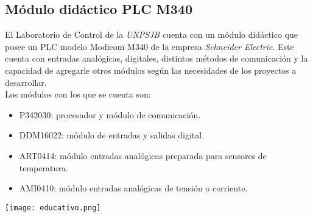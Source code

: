 \subsection{Módulo didáctico PLC M340} \label{sec:didac}

El Laboratorio de Control de la \textit{UNPSJB} cuenta con un módulo didáctico que posee un PLC modelo Modicom M340 de la empresa \textit{Schneider Electric}. Este cuenta con entradas analógicas, digitales, distintos métodos de comunicación y la capacidad de agregarle otros módulos según las necesidades de los proyectos a desarrollar.  \\
Los módulos con los que se cuenta son:
\begin{itemize}
	\item P342030: procesador y módulo de comunicación.
	\item DDM16022: módulo de entradas y salidas digital.
	\item ART0414: módulo entradas analógicas preparada para sensores de temperatura.
	\item AMI0410: módulo entradas analógicas de tensión o corriente. 
	
\end{itemize}
\begin{center}
	\texttt{[image: educativo.png]}
	\label{fig:didac}
\end{center}




